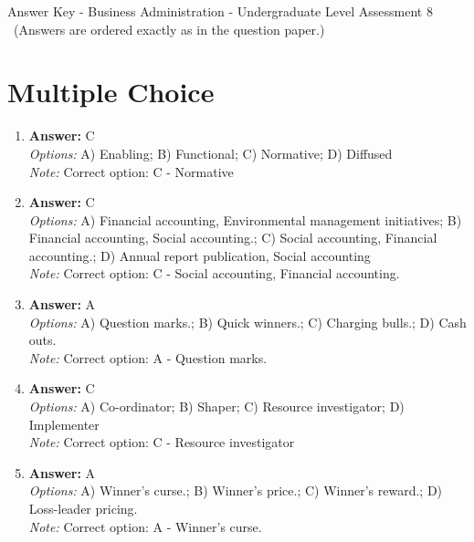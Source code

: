 \documentclass[12pt]{article}
\begin{document}
\begin{center}
Answer Key - Business Administration - Undergraduate Level Assessment 8 \
\small (Answers are ordered exactly as in the question paper.)
\end{center}

\section*{Multiple Choice}
\begin{enumerate}[label=\arabic*.]
\item \textbf{Answer:} C
\\ \textit{Options:} A) Enabling; B) Functional; C) Normative; D) Diffused
\\ \textit{Note:} Correct option: C - Normative
\item \textbf{Answer:} C
\\ \textit{Options:} A) Financial accounting, Environmental management initiatives; B) Financial accounting, Social accounting.; C) Social accounting, Financial accounting.; D) Annual report publication, Social accounting
\\ \textit{Note:} Correct option: C - Social accounting, Financial accounting.
\item \textbf{Answer:} A
\\ \textit{Options:} A) Question marks.; B) Quick winners.; C) Charging bulls.; D) Cash outs.
\\ \textit{Note:} Correct option: A - Question marks.
\item \textbf{Answer:} C
\\ \textit{Options:} A) Co-ordinator; B) Shaper; C) Resource investigator; D) Implementer
\\ \textit{Note:} Correct option: C - Resource investigator
\item \textbf{Answer:} A
\\ \textit{Options:} A) Winner's curse.; B) Winner's price.; C) Winner's reward.; D) Loss-leader pricing.
\\ \textit{Note:} Correct option: A - Winner's curse.
\end{enumerate}
\end{document}
